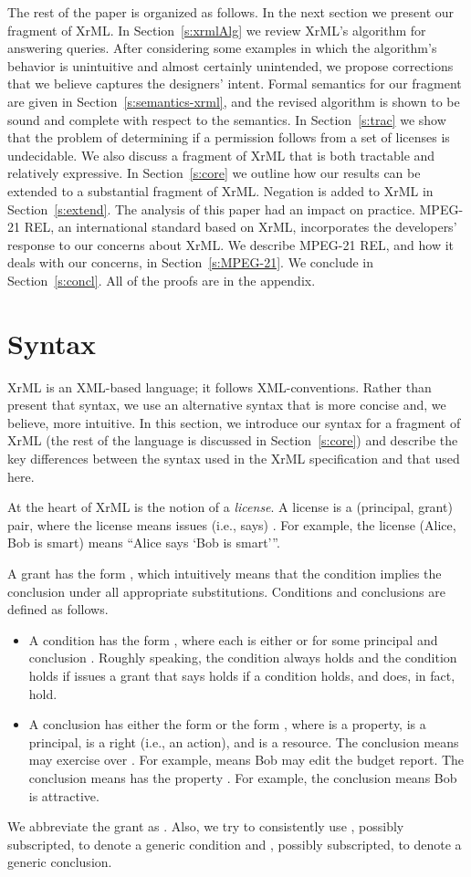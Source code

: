 \documentclass{acmtrans2m}
\newcommand{\<}{
}
\renewcommand{\>}{\rangle}
\begin{document}
The rest of the paper is organized as follows.  In the next section we present
our
fragment of XrML.  In Section~\ref{s:xrmlAlg} we review XrML's algorithm for
answering queries.  After considering some examples in which the algorithm's behavior is
unintuitive and almost certainly unintended, we propose corrections that we believe captures
the designers' intent.  Formal semantics for
our fragment
are given in Section~\ref{s:semantics-xrml},
and the revised algorithm is shown to be sound and complete with respect to the semantics.  In
Section~\ref{s:trac} we show that the problem of determining if a permission follows from a set
of licenses is undecidable.  We also discuss a fragment of
XrML
that is both tractable
and relatively expressive.  In Section~\ref{s:core} we outline how our
results can be extended to
a substantial
fragment of XrML.
Negation is added to XrML in Section~\ref{s:extend}.
The analysis of this paper had an impact on practice.
MPEG-21 REL, an international standard based on XrML,
incorporates the developers' response to our concerns about XrML.
We describe MPEG-21 REL, and how it deals with our concerns,
in Section~\ref{s:MPEG-21}.
We conclude in Section~\ref{s:concl}.  All of the proofs are in the
appendix.

\section{Syntax}\label{s:XrMLsyntax}
XrML is an XML-based language; it follows XML-conventions.  Rather than present that syntax,
we use an alternative syntax that is more concise and, we believe, more intuitive.  In this
section, we introduce our syntax for a
fragment of XrML (the rest of the
language is discussed in Section~\ref{s:core}) and describe the key differences between the
syntax used in the XrML specification and that used here.

At the heart of XrML is the notion of a \emph{license}.  A license is a (principal, grant)
pair, where the license  means  issues (i.e., says) .  For example, the
license (Alice, Bob is smart) means ``Alice says `Bob is smart'''.

A grant has the form , which intuitively means that the condition implies the conclusion
under all appropriate substitutions.  Conditions and conclusions are defined as follows.
\begin{itemize}
\item A condition has the form , where each  is either
 or  for some principal  and conclusion .  Roughly speaking,
the condition  always holds and the condition  holds if  issues a
grant that says  holds if a condition  holds, and  does, in fact, hold.
\item A conclusion has either the form  or the form , where
 is a property,  is a principal,  is a right (i.e., an action), and  is a
resource.  The conclusion  means  may exercise  over .  For
example,  means
Bob may edit the budget report.  The conclusion  means  has the property .
For example, the conclusion  means Bob is attractive.
\end{itemize}
We abbreviate the grant  as
.  Also, we try to consistently use , possibly
subscripted, to denote a generic condition and , possibly subscripted, to denote a
generic conclusion.
\end{document}
